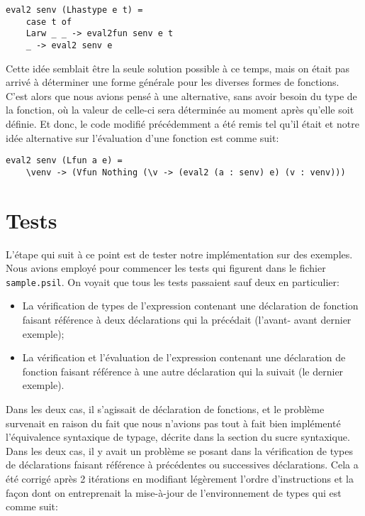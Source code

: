 \documentclass[11pt, titlepage]{article}
\begin{document}
\begin{lstlisting}
eval2 senv (Lhastype e t) =
    case t of
    Larw _ _ -> eval2fun senv e t
    _ -> eval2 senv e
\end{lstlisting}
Cette idée semblait être la seule solution possible à ce temps, mais on était
pas arrivé à déterminer une forme générale pour les diverses formes de
fonctions. C'est alors que nous avions pensé à une alternative, sans avoir
besoin du type de la fonction, où la valeur de celle-ci sera déterminée au
moment après qu'elle soit définie. Et donc, le code modifié précédemment a été
remis tel qu'il était et notre idée alternative sur l'évaluation d'une fonction
est comme suit:

\begin{lstlisting}
eval2 senv (Lfun a e) =
    \venv -> (Vfun Nothing (\v -> (eval2 (a : senv) e) (v : venv)))
\end{lstlisting}

\section{Tests}

L'étape qui suit à ce point est de tester notre implémentation sur des
exemples. Nous avions employé pour commencer les tests qui figurent dans le
fichier \texttt{sample.psil}. On voyait que tous les tests passaient sauf deux
en particulier:

\begin{itemize}
    \item La vérification de types de l'expression contenant une déclaration de
    fonction faisant référence à deux déclarations qui la précédait (l'avant-
    avant dernier exemple);
    \item La vérification et l'évaluation de l'expression contenant une
    déclaration de fonction faisant référence à une autre déclaration qui la
    suivait (le dernier exemple).
\end{itemize}

Dans les deux cas, il s'agissait de déclaration de fonctions, et le problème
survenait en raison du fait que nous n'avions pas tout à fait bien implémenté
l'équivalence syntaxique de typage, décrite dans la section du sucre
syntaxique. \\

Dans les deux cas, il y avait un problème se posant dans la vérification de
types de déclarations faisant référence à précédentes ou successives
déclarations. Cela a été corrigé après 2 itérations en modifiant légèrement
l'ordre d'instructions et la façon dont on entreprenait la mise-à-jour de
l'environnement de types qui est comme suit:
\end{document}
